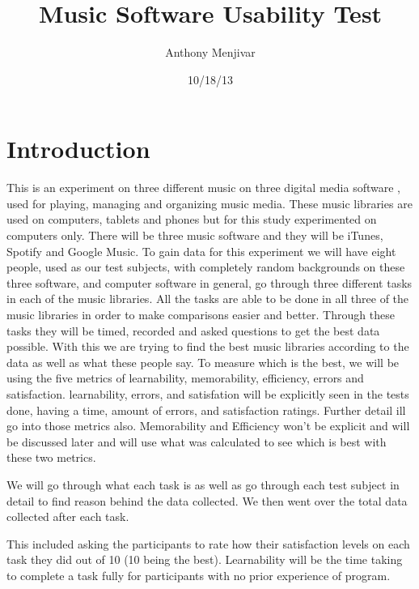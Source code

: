 \documentclass{article}
\title{Music Software Usability Test}
\author{Anthony Menjivar}
\date{10/18/13}
\begin{document}
\maketitle


\section{Introduction}	
This is an experiment on three different music on three digital media software , used for playing, managing and organizing music media. These music libraries are used on computers, tablets and phones but for this study experimented on computers only. There will be three music software and they will be iTunes, Spotify and Google Music.  To gain data for this experiment we will have eight people, used as our test subjects, with completely random backgrounds on these three software, and computer software in general, go through three different tasks in each of the music libraries. All the tasks are able to be done in all three of the music libraries in order to make comparisons easier and better. Through these tasks they will be timed, recorded and asked questions to get the best data possible. With this we are trying to find the best  music libraries according to the data as well as what these people say. To measure which is the best, we will be using the five metrics of learnability, memorability, efficiency, errors and satisfaction. learnability, errors, and satisfation will be explicitly seen in the tests done, having a time, amount of errors, and satisfaction ratings. Further detail ill go into those metrics also. Memorability and Efficiency won't be explicit and will be discussed later and  will use what was calculated to see which is best with these two metrics.

We will go through what each task is as well as go through each test subject in detail to find reason behind the data collected. We then went over the total data collected after each task. 

This included asking the participants to rate how their satisfaction levels on each task they did out of 10 (10 being the best). Learnability will be the time taking to complete a task fully for participants with no prior experience of program.
\end{document}
